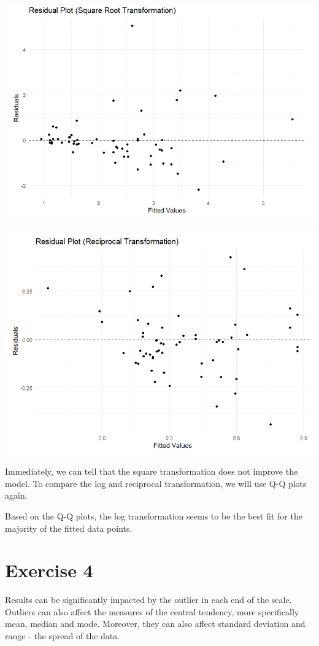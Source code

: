 \documentclass{article}
\begin{document}
\begin{center}
\includegraphics[scale=0.5]{graphs/graph-sqrt.png}
\end{center}

\begin{center}
\includegraphics[scale=0.5]{graphs/graph-over.png}
\end{center}

Immediately, we can tell that the square transformation does not improve the model. To compare the log and reciprocal transformation, we will use Q-Q plots again.

Based on the Q-Q plots, the log transformation seems to be the best fit for the majority of the fitted data points.

\section{Exercise 4}
Results can be significantly impacted by the outlier in each end of the scale. Outliers can also affect the measures of the central tendency, more specifically mean, median and mode. Moreover, they can also affect standard deviation and range - the spread of the data.
\end{document}
